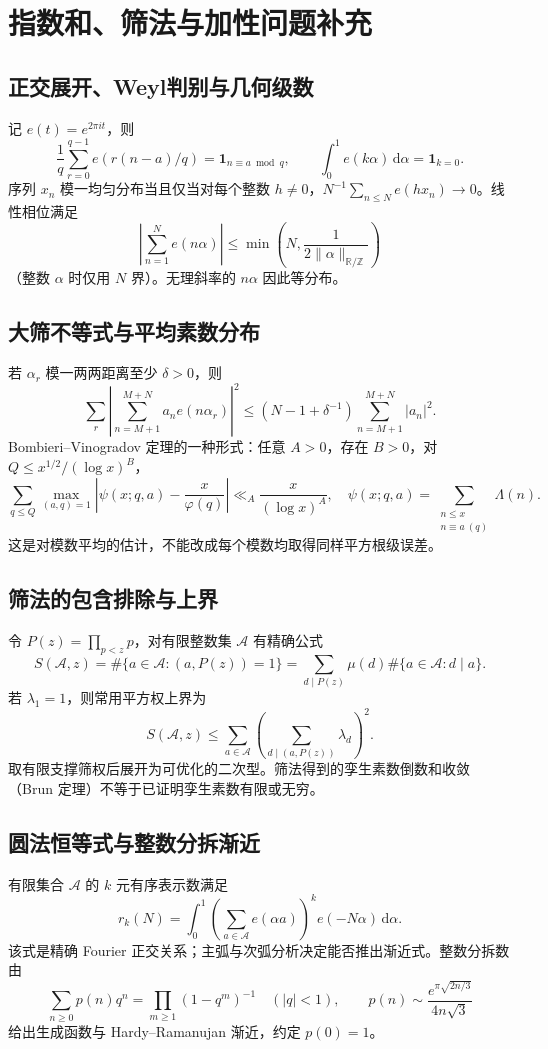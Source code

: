\documentclass[../main.tex]{subfiles}
\begin{document}
\section{指数和、筛法与加性问题补充}
\subsection{正交展开、Weyl判别与几何级数}
记 $e(t)=e^{2\pi it}$，则
\[
\frac1q\sum_{r=0}^{q-1}e(r(n-a)/q)=\bm1_{n\equiv a\bmod q},\qquad
\int_0^1e(k\alpha)\,\mathrm d\alpha=\bm1_{k=0}.
\]
序列 $x_n$ 模一均匀分布当且仅当对每个整数 $h\ne0$，$N^{-1}\sum_{n\le N}e(hx_n)\to0$。线性相位满足
\[
\left|\sum_{n=1}^Ne(n\alpha)\right|\le\min\left(N,\frac1{2\|\alpha\|_{\mathbb R/\mathbb Z}}\right)
\]
（整数 $\alpha$ 时仅用 $N$ 界）。无理斜率的 $n\alpha$ 因此等分布。
\subsection{大筛不等式与平均素数分布}
若 $\alpha_r$ 模一两两距离至少 $\delta>0$，则
\[
\sum_r\left|\sum_{n=M+1}^{M+N}a_ne(n\alpha_r)\right|^2
\le(N-1+\delta^{-1})\sum_{n=M+1}^{M+N}|a_n|^2.
\]
Bombieri--Vinogradov 定理的一种形式：任意 $A>0$，存在 $B>0$，对 $Q\le x^{1/2}/(\log x)^B$，
\[
\sum_{q\le Q}\max_{(a,q)=1}\left|\psi(x;q,a)-\frac x{\varphi(q)}\right|
\ll_A\frac x{(\log x)^A},\quad
\psi(x;q,a)=\sum_{\substack{n\le x\\n\equiv a\ (q)}}\Lambda(n).
\]
这是对模数平均的估计，不能改成每个模数均取得同样平方根级误差。
\subsection{筛法的包含排除与上界}
令 $P(z)=\prod_{p<z}p$，对有限整数集 $\mathcal A$ 有精确公式
\[
S(\mathcal A,z)=\#\{a\in\mathcal A:(a,P(z))=1\}
=\sum_{d\mid P(z)}\mu(d)\#\{a\in\mathcal A:d\mid a\}.
\]
若 $\lambda_1=1$，则常用平方权上界为
\[
S(\mathcal A,z)\le\sum_{a\in\mathcal A}\left(\sum_{d\mid(a,P(z))}\lambda_d\right)^2.
\]
取有限支撑筛权后展开为可优化的二次型。筛法得到的孪生素数倒数和收敛（Brun 定理）不等于已证明孪生素数有限或无穷。
\subsection{圆法恒等式与整数分拆渐近}
有限集合 $\mathcal A$ 的 $k$ 元有序表示数满足
\[
r_k(N)=\int_0^1\left(\sum_{a\in\mathcal A}e(\alpha a)\right)^ke(-N\alpha)\,\mathrm d\alpha.
\]
该式是精确 Fourier 正交关系；主弧与次弧分析决定能否推出渐近式。整数分拆数由
\[
\sum_{n\ge0}p(n)q^n=\prod_{m\ge1}(1-q^m)^{-1}\quad(|q|<1),\qquad
p(n)\sim\frac{e^{\pi\sqrt{2n/3}}}{4n\sqrt3}
\]
给出生成函数与 Hardy--Ramanujan 渐近，约定 $p(0)=1$。
\end{document}
